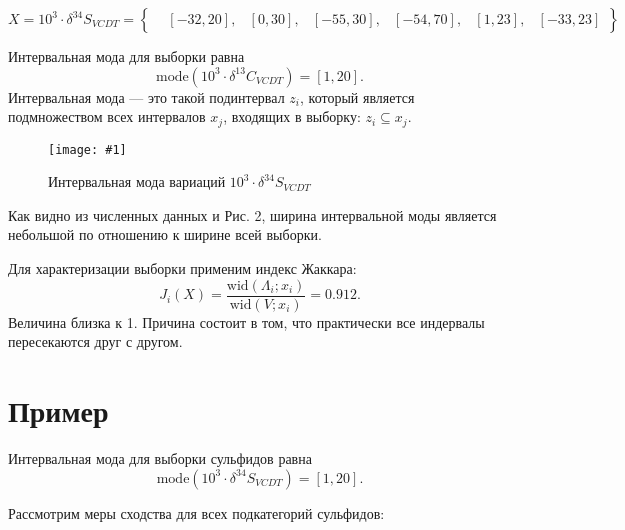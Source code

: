 \documentclass[a4paper,12pt]{article}
\newcommand{\plot}[3]{
    \begin{figure}[H]
        \begin{center}
            \texttt{[image: \#1]}
            \caption{#2}
            \label{#3}
        \end{center}
    \end{figure}
}
\begin{document}
    \[
    X = 10^3 \cdot \delta^{34}S_{VCDT} = \left\{
    \begin{aligned}
    &[-32, 20], &[0, 30], &[-55, 30], &[-54, 70], &[1, 23], &[-33, 23]
    \end{aligned}
    \right\}
    \]

    Интервальная мода для выборки равна
    \[
    \text{mode}(10^3 \cdot \delta^{13}C_{VCDT}) = [1, 20].
    \]
    Интервальная мода — это такой подинтервал \(z_i\), который является подмножеством всех интервалов \(x_j\), входящих в выборку: \(z_i \subseteq x_j\).
    \plot{sulfide_mode}{Интервальная мода вариаций \(10^3 \cdot \delta^{34}S_{VCDT}\)}{p:sulfide_mod}

    Как видно из численных данных и Рис. 2, ширина интервальной моды является небольшой по отношению к ширине всей выборки.

    Для характеризации выборки применим индекс Жаккара:
    \[
    J_i(X) = \frac{\text{wid}(\Lambda_i; x_i)}{\text{wid}(V; x_i)} = 0.912.
    \]
    Величина близка к 1. Причина состоит в том, что практически все индервалы пересекаются друг с другом.

    \section{Пример}
    Интервальная мода для выборки сульфидов равна
    \[
    \text{mode}(10^3 \cdot \delta^{34}S_{VCDT}) = [1, 20].
    \]

    Рассмотрим меры сходства для всех подкатегорий сульфидов:
\end{document}
